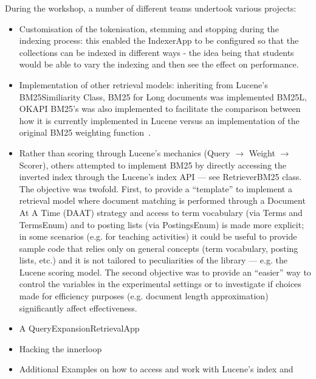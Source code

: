 During the workshop, a number of different teams undertook various projects:
\begin{itemize}
	\item Customisation of the tokenisation, stemming and stopping during the indexing process: this enabled the IndexerApp to be configured so that the collections can be indexed in different ways - the idea being that students would be able to vary the indexing and then see the effect on performance.
	\item Implementation of other retrieval models: inheriting from Lucene's BM25Similiarity Class, BM25 for Long documents was implemented BM25L\cite{Lv:2011:DVL:2009916.2010070}, OKAPI BM25's was also implemented to facilitate the comparison between how it is currently implemented in Lucene versus an implementation of the original BM25 weighting function~\cite{}.
	\item Rather than scoring through Lucene's mechanics (Query $\rightarrow$ Weight $\rightarrow$ Scorer), others attempted to implement BM25 by directly accessing the inverted index through the Lucene's index API --- see RetrieverBM25 class. The objective was twofold. First, to provide a ``template'' to implement a retrieval model where document matching is performed through a Document At A Time (DAAT) strategy and access to term vocabulary (via Terms and TermsEnum) and to posting lists (via PostingsEnum) is made more explicit; in some scenarios (e.g. for teaching activities) it could be useful to provide sample code that relies only on general concepts (term vocabulary, posting lists, etc.) and it is not tailored to peculiarities of the library --- e.g. the Lucene scoring model. The second objective was to provide an ``easier'' way to control the variables in the experimental settings or to investigate if choices made for efficiency purposes (e.g. document length approximation) significantly affect effectiveness.
	\item A QueryExpansionRetrievalApp
	\item Hacking the innerloop
	\item Additional Examples on how to access and work with Lucene's index and
\end{itemize}
